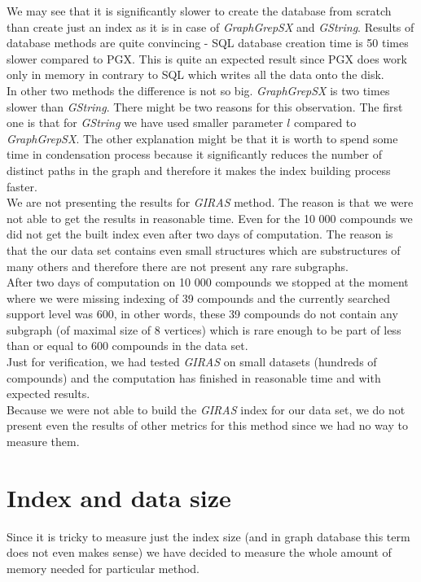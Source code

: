 We may see that it is significantly slower to create the database from scratch than create just an index as it is in case of \textit{GraphGrepSX} and \textit{GString}. Results of database methods are quite convincing - SQL database creation time is 50 times slower compared to PGX. This is quite an expected result since PGX does work only in memory in contrary to SQL which writes all the data onto the disk.\\

In other two methods the difference is not so big. \textit{GraphGrepSX} is two times slower than \textit{GString}. There might be two reasons for this observation. The first one is that for \textit{GString} we have used smaller parameter $l$ compared to \textit{GraphGrepSX}. The other explanation might be that it is worth to spend some time in condensation process because it significantly reduces the number of distinct paths in the graph and therefore it makes the index building process faster.\\

We are not presenting the results for \textit{GIRAS} method. The reason is that we were not able to get the results in reasonable time. Even for the 10 000 compounds we did not get the built index even after two days of computation. The reason is that the our data set contains even small structures which are substructures of many others and therefore there are not present any rare subgraphs.\\

After two days of computation on 10 000 compounds we stopped at the moment where we were missing indexing of 39 compounds and the currently searched support level was 600, in other words, these 39 compounds do not contain any subgraph (of maximal size of 8 vertices) which is rare enough to be part of less than or equal to 600 compounds in the data set.\\

Just for verification, we had tested \textit{GIRAS} on small datasets (hundreds of compounds) and the computation has finished in reasonable time and with expected results.\\

Because we were not able to build the \textit{GIRAS} index for our data set, we do not present even the results of other metrics for this method since we had no way to measure them.

\section{Index and data size}
Since it is tricky to measure just the index size (and in graph database this term does not even makes sense) we have decided to measure the whole amount of memory needed for particular method.\\

